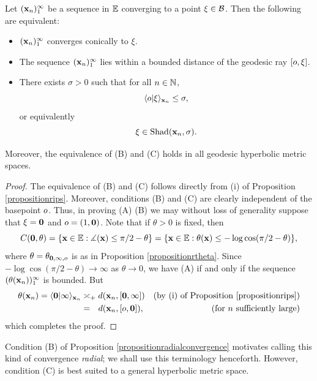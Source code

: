 \begin{proposition}
\label{propositionradialconvergence}
Let $(\mathbf x_n)_1^\infty$ be a sequence in $\E$ converging to a point $\xi\in\mathcal B$. Then the following are equivalent:
\begin{itemize}
\item[(A)] $(\mathbf x_n)_1^\infty$ converges conically to $\xi$.
\item[(B)] The sequence $(\mathbf x_n)_1^\infty$ lies within a bounded distance of the geodesic ray $[o,\xi]$.
\item[(C)] There exists $\sigma > 0$ such that for all $n\in\N$,
\[
\langle o|\xi\rangle_{\mathbf x_n}\leq\sigma,
\]
or equivalently
\begin{equation}
\label{sigmaradially}
\xi\in\operatorname{Shad}(\mathbf x_n,\sigma).
\end{equation}
\end{itemize}
Moreover, the equivalence of (B) and (C) holds in all geodesic hyperbolic metric spaces.
\end{proposition}
\begin{proof}
The equivalence of (B) and (C) follows directly from (i) of Proposition \ref{propositionrips}. Moreover, conditions (B) and (C) are clearly independent of the basepoint $o$. Thus, in proving (A) \iff (B) we may without loss of generality suppose that $\xi = \mathbf 0$ and $o = (1,\mathbf 0)$. Note that if $\theta > 0$ is fixed, then
\[
C(\0,\theta) = \{\xx\in\E : \ang(\xx) \leq \pi/2 - \theta\}
= \{\xx\in\E : \theta(\xx) \leq -\log\cos(\pi/2 - \theta)\},
\]
where $\theta = \theta_{\mathbf 0,\infty,o}$ is as in Proposition \ref{propositionrtheta}. Since $-\log\cos(\pi/2 - \theta) \to \infty$ as $\theta \to 0$, we have (A) if and only if the sequence $(\theta(\mathbf x_n))_1^\infty$ is bounded. But
\begin{align*}
\theta(\xx_n) = \lb \0 | \infty \rb_{\xx_n}
&\asymp_\plus \dist(\xx_n,\geo\0\infty) \by{(i) of Proposition \ref{propositionrips}}\\
&=_\pt \dist(\xx_n,\geo\zero\0), &\text{(for $n$ sufficiently large)}
\end{align*}
which completes the proof.
\end{proof}

Condition (B) of Proposition \ref{propositionradialconvergence} motivates calling this kind of convergence \emph{radial}; we shall use this terminology henceforth. However, condition (C) is best suited to a general hyperbolic metric space.

